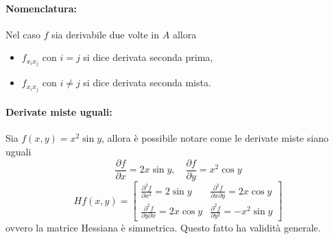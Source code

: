 \paragraph{Nomenclatura:} Nel caso $f$ sia derivabile due volte in $A$ allora
\begin{itemize}
	\item $f_{x_ix_j}$ con $i=j$ si dice derivata seconda prima,
	\item $f_{x_ix_j}$ con $i\neq j$ si dice derivata seconda mista.
\end{itemize}

\paragraph{Derivate miste uguali:} Sia $f(x,y)=x^2\sin y$, allora è possibile notare come le derivate miste siano uguali
\begin{equation*}
	\frac{\partial f}{\partial x} = 2x\sin y, \quad	\frac{\partial f}{\partial y} = x^2\cos y
\end{equation*}
\begin{equation*}
	Hf(x,y)=
	\begin{bmatrix}
		\frac{\partial^2 f}{\partial x^2} = 2\sin y & 	\frac{\partial ^2 f}{\partial x\partial y} = 2x\cos y\\
		\frac{\partial ^2 f}{\partial y\partial x} = 2x\cos y & \frac{\partial^2 f}{\partial y^2} = -x^2\sin y
	\end{bmatrix}
\end{equation*}
ovvero la matrice Hessiana è simmetrica. Questo fatto ha validità generale.

